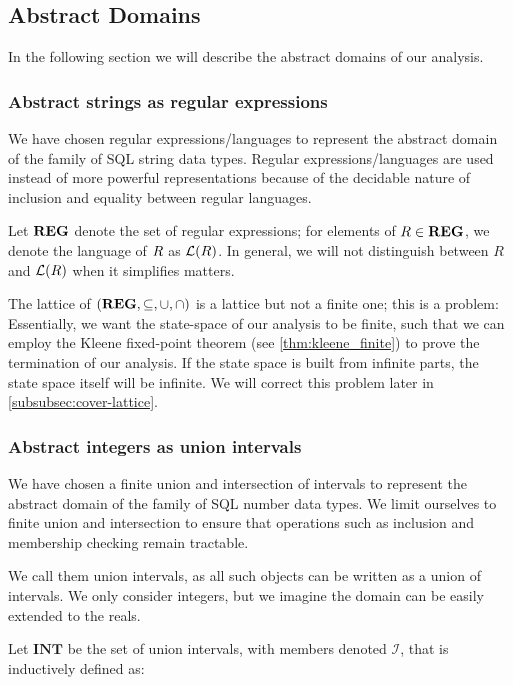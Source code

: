 \subsection{Abstract Domains}\label{subsec:abstract-domains}
In the following section we will describe the abstract domains of our analysis.

\subsubsection{Abstract strings as regular expressions}\label{subsubsec:abstract_domains_strings}
We have chosen regular expressions/languages to represent the abstract domain of the family of SQL string data types.
Regular expressions/languages are used instead of more powerful representations because of the decidable nature of inclusion and equality between regular languages.

Let $\mathbf{REG}$ denote the set of regular expressions; for elements of $R \in \mathbf{REG}$, we denote the language of $R$ as $\mathcal{L}(R)$.
In general, we will not distinguish between $R$ and $\mathcal{L}(R)$ when it simplifies matters.

The lattice of $(\mathbf{REG}, \subseteq, \cup, \cap)$ is a lattice but not a finite one; this is a problem: Essentially, we want the state-space of our analysis to be finite, such that we can employ the Kleene fixed-point theorem (see \autoref{thm:kleene_finite}) to prove the termination of our analysis.
If the state space is built from infinite parts, the state space itself will be infinite.
We will correct this problem later in \autoref{subsubsec:cover-lattice}.

\subsubsection{Abstract integers as union intervals}\label{subsubsec:abstract_domains_numbers}
We have chosen a finite union and intersection of intervals to represent the abstract domain of the family of SQL number data types.
We limit ourselves to finite union and intersection to ensure that operations such as inclusion and membership checking remain tractable.

We call them union intervals, as all such objects can be written as a union of intervals.
We only consider integers, but we imagine the domain can be easily extended to the reals.

Let $\mathbf{INT}$ be the set of union intervals, with members denoted $\mathscr{I}$, that is inductively defined as:


